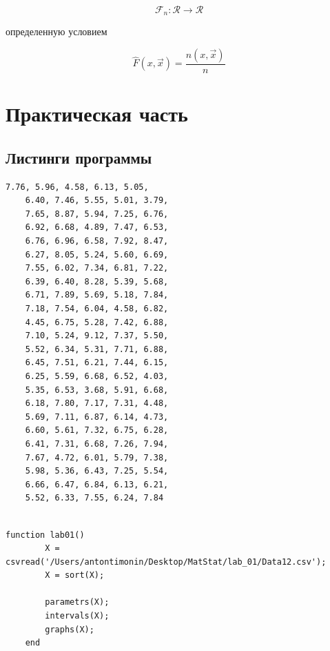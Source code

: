 \documentclass[12pt, a4paper]{report}
\begin{document}
	\begin{equation*}
	\mathcal{F}_n: \mathcal{R} \to \mathcal{R}
	\end{equation*}
	
	\hspace{1cm} определенную условием
	
	\begin{equation*}
		\hat F(x, \vec{x}) = \frac{n(x, \vec{x})}{n}
	\end{equation*}
	
	
	\newpage
	
	\section{Практическая часть}
	
	\subsection{Листинги программы}
	\begin{lstlisting}[caption=Содержимое генеральной совокупности X]
	7.76, 5.96, 4.58, 6.13, 5.05,
	6.40, 7.46, 5.55, 5.01, 3.79,
	7.65, 8.87, 5.94, 7.25, 6.76,
	6.92, 6.68, 4.89, 7.47, 6.53,
	6.76, 6.96, 6.58, 7.92, 8.47,
	6.27, 8.05, 5.24, 5.60, 6.69,
	7.55, 6.02, 7.34, 6.81, 7.22, 
	6.39, 6.40, 8.28, 5.39, 5.68, 
	6.71, 7.89, 5.69, 5.18, 7.84, 
	7.18, 7.54, 6.04, 4.58, 6.82, 
	4.45, 6.75, 5.28, 7.42, 6.88, 
	7.10, 5.24, 9.12, 7.37, 5.50, 
	5.52, 6.34, 5.31, 7.71, 6.88, 
	6.45, 7.51, 6.21, 7.44, 6.15, 
	6.25, 5.59, 6.68, 6.52, 4.03, 
	5.35, 6.53, 3.68, 5.91, 6.68, 
	6.18, 7.80, 7.17, 7.31, 4.48, 
	5.69, 7.11, 6.87, 6.14, 4.73, 
	6.60, 5.61, 7.32, 6.75, 6.28, 
	6.41, 7.31, 6.68, 7.26, 7.94, 
	7.67, 4.72, 6.01, 5.79, 7.38, 
	5.98, 5.36, 6.43, 7.25, 5.54, 
	6.66, 6.47, 6.84, 6.13, 6.21, 
	5.52, 6.33, 7.55, 6.24, 7.84
	
	\end{lstlisting}
	
	\begin{lstlisting}[caption=Точка входа программы]
	function lab01()
		X = csvread('/Users/antontimonin/Desktop/MatStat/lab_01/Data12.csv');
		X = sort(X);
	
		parametrs(X);
		intervals(X);
		graphs(X); 
	end
	\end{lstlisting}
	
\end{document}
